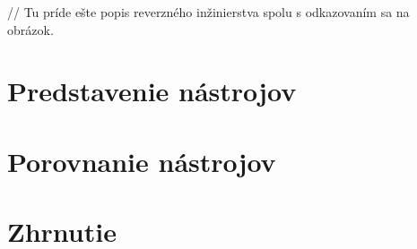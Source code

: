 \documentclass[10pt,twoside,slovak,a4paper]{article}
\begin{document}
// Tu príde ešte popis reverzného inžinierstva spolu s odkazovaním sa na obrázok.
\section{Predstavenie nástrojov}\label{predstavenie}

\section{Porovnanie nástrojov}\label{porovnanie}

\section{Zhrnutie} \label{zhrnutie} 







\end{document}
